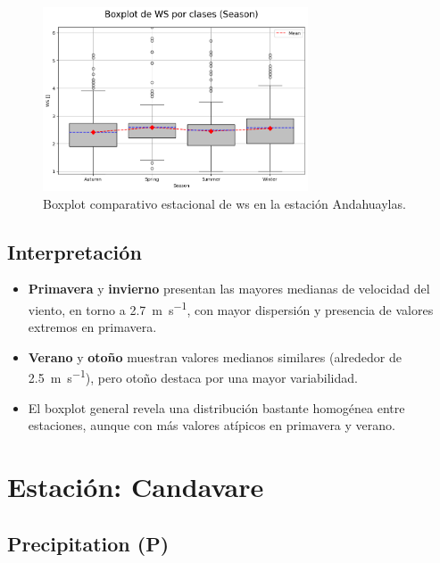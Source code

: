 \vspace{0.2cm}

\begin{figure}[htbp]
\centering
\includegraphics[width=0.7\textwidth]{resultados/por_estacion_del_anio/boxplot_clases_por_estacion/Andahuaylas/WS_ClassBoxplot_Season.png}
\caption{Boxplot comparativo estacional de \gls{ws}  en la estación Andahuaylas.}
\label{fig:andahuaylas_ws_box}
\end{figure}

\subsection*{Interpretación}

\begin{itemize}
    \item \textbf{Primavera} y \textbf{invierno} presentan las mayores medianas de velocidad del viento, en torno a \SI{2.7}{\meter\per\second}, con mayor dispersión y presencia de valores extremos en primavera.
    \item \textbf{Verano} y \textbf{otoño} muestran valores medianos similares (alrededor de \SI{2.5}{\meter\per\second}), pero otoño destaca por una mayor variabilidad.
    \item El boxplot general revela una distribución bastante homogénea entre estaciones, aunque con más valores atípicos en primavera y verano.
\end{itemize}

\section{Estación: Candavare}

\subsection{Precipitation (P)}

